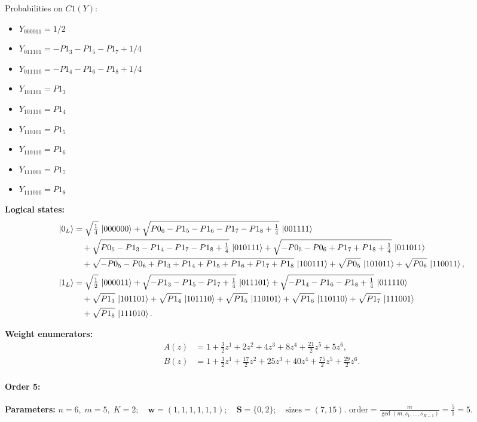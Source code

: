 \documentclass[11pt]{article}
\begin{document}
Probabilities on $C1 (Y)$:
\begin{itemize}
    \item $Y_{000011} = 1/2$
    \item $Y_{011101} = -P1_3 - P1_5 - P1_7 + 1/4$
    \item $Y_{011110} = -P1_4 - P1_6 - P1_8 + 1/4$
    \item $Y_{101101} = P1_3$
    \item $Y_{101110} = P1_4$
    \item $Y_{110101} = P1_5$
    \item $Y_{110110} = P1_6$
    \item $Y_{111001} = P1_7$
    \item $Y_{111010} = P1_8$
\end{itemize}

\noindent\textbf{Logical states:}
\begin{align*}
\ket{0_L} &= \sqrt{\tfrac{1}{4}}\,\ket{000000} + \sqrt{P0_6 - P1_5 - P1_6 - P1_7 - P1_8 + \tfrac{1}{4}}\,\ket{001111}\\
&\quad + \sqrt{P0_5 - P1_3 - P1_4 - P1_7 - P1_8 + \tfrac{1}{4}}\,\ket{010111} + \sqrt{-P0_5 - P0_6 + P1_7 + P1_8 + \tfrac{1}{4}}\,\ket{011011}\\
&\quad + \sqrt{-P0_5 - P0_6 + P1_3 + P1_4 + P1_5 + P1_6 + P1_7 + P1_8}\,\ket{100111} + \sqrt{P0_5}\,\ket{101011} + \sqrt{P0_6}\,\ket{110011},
\\[2pt]
\ket{1_L} &= \sqrt{\tfrac{1}{2}}\,\ket{000011} + \sqrt{-P1_3 - P1_5 - P1_7 + \tfrac{1}{4}}\,\ket{011101} + \sqrt{-P1_4 - P1_6 - P1_8 + \tfrac{1}{4}}\,\ket{011110}\\
&\quad + \sqrt{P1_3}\,\ket{101101} + \sqrt{P1_4}\,\ket{101110} + \sqrt{P1_5}\,\ket{110101} + \sqrt{P1_6}\,\ket{110110} + \sqrt{P1_7}\,\ket{111001}\\
&\quad + \sqrt{P1_8}\,\ket{111010}.
\end{align*}

\noindent\textbf{Weight enumerators:}
\begin{align*}
A(z) &= 1 + \tfrac{3}{2}z^{1} + 2z^{2} + 4z^{3} + 8z^{4} + \tfrac{21}{2}z^{5} + 5z^{6},\\[2pt]
B(z) &= 1 + \tfrac{3}{2}z^{1} + \tfrac{17}{2}z^{2} + 25z^{3} + 40z^{4} + \tfrac{75}{2}z^{5} + \tfrac{29}{2}z^{6}.
\end{align*}

\paragraph{\textbf{Order 5:}}
\noindent\textbf{Parameters:} $n=6,\; m=5,\; K=2;\quad \mathbf w=(1, 1, 1, 1, 1, 1);\quad \mathbf S=\{0, 2\};\quad \text{sizes}=\left(7, 15\right).$ $\displaystyle \text{order}=\frac{m}{\gcd(m,s_1,\dots,s_{K-1})}=\frac{5}{1}=5.$
\end{document}
